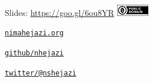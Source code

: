\documentclass[12pt,t,handout]{beamer}
\begin{document}
\begin{frame}[c]{}

\Large
Slides: \href{https://goo.gl/6ou8YR}{https://goo.gl/6ou8YR} \quad
\includegraphics[height=5mm]{Figs/cc-zero.png}

\vspace{10mm}

\href{http://nimahejazi.org}{\tt nimahejazi.org}

\vspace{10mm}

\href{https://github.com/nhejazi}{\tt github/nhejazi}

\vspace{10mm}

\href{https://twitter.com/nshejazi}{\tt twitter/@nshejazi}



\end{frame}
\end{document}
